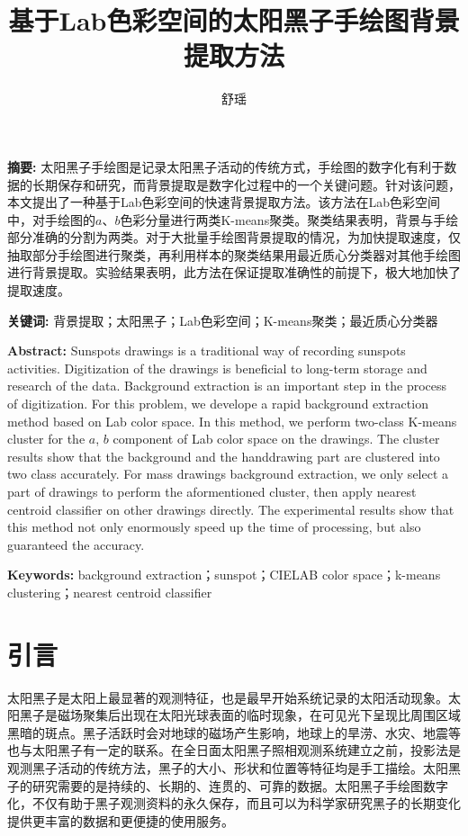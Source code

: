 \documentclass[UTF8,a4paper,twoside]{ctexart}
\title{基于Lab色彩空间的太阳黑子手绘图背景提取方法}
\author{舒瑶}
\date{}
\begin{document}
\maketitle

\textbf{摘要: }太阳黑子手绘图是记录太阳黑子活动的传统方式，手绘图的数字化有利于数据的长期保存和研究，而背景提取是数字化过程中的一个关键问题。针对该问题，本文提出了一种基于Lab色彩空间的快速背景提取方法。该方法在Lab色彩空间中，对手绘图的$a$、$b$色彩分量进行两类K-means聚类。聚类结果表明，背景与手绘部分准确的分割为两类。对于大批量手绘图背景提取的情况，为加快提取速度，仅抽取部分手绘图进行聚类，再利用样本的聚类结果用最近质心分类器对其他手绘图进行背景提取。实验结果表明，此方法在保证提取准确性的前提下，极大地加快了提取速度。

\textbf{关键词: }背景提取；太阳黑子；Lab色彩空间；K-means聚类；最近质心分类器

\textbf{Abstract: }Sunspots drawings is a traditional way of recording sunspots activities. Digitization of the drawings is beneficial to long-term storage and research of the data. Background extraction is an important step in the process of digitization. For this problem, we develope a rapid background extraction method based on Lab color space. In this method, we perform two-class K-means cluster for the $a$, $b$ component of Lab color space on the drawings. The cluster results show that the background and the handdrawing part are clustered into two class accurately. For mass drawings background extraction, we only select a part of drawings to perform the aformentioned cluster, then apply nearest centroid classifier on other drawings directly. The experimental results show that this method not only enormously speed up the time of processing, but also guaranteed the accuracy.

\textbf{Keywords: }background extraction；sunspot；CIELAB color space；k-means clustering；nearest centroid classifier

\section{引言}
太阳黑子是太阳上最显著的观测特征，也是最早开始系统记录的太阳活动现象\cite{李冉阳2016}。太阳黑子是磁场聚集后出现在太阳光球表面的临时现象，在可见光下呈现比周围区域黑暗的斑点。黑子活跃时会对地球的磁场产生影响，地球上的旱涝、水灾、地震等也与太阳黑子有一定的联系\cite{刘学富1999太阳黑子的观测}。在全日面太阳黑子照相观测系统建立之前，投影法是观测黑子活动的传统方法，黑子的大小、形状和位置等特征均是手工描绘。太阳黑子的研究需要的是持续的、长期的、连贯的、可靠的数据。太阳黑子手绘图数字化，不仅有助于黑子观测资料的永久保存，而且可以为科学家研究黑子的长期变化提供更丰富的数据和更便捷的使用服务。
\end{document}
